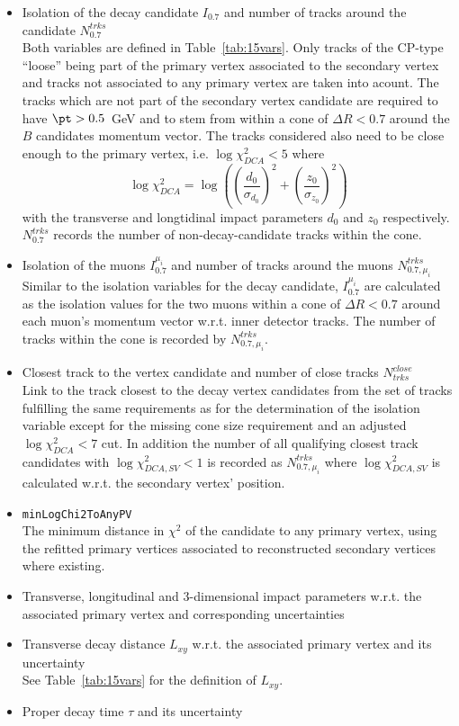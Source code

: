 \begin{itemize}
\item Isolation of the decay candidate $I_{0.7}$ and 
  number of tracks around the candidate $N^{trks}_{0.7}$\\
  Both variables are defined in Table~\ref{tab:15vars}.  Only 
  tracks of the CP-type ``loose'' being part of the primary vertex 
  associated to the secondary vertex and tracks not associated to any
  primary vertex are taken into acount.  The tracks which are not part
  of the secondary vertex candidate are required to
  have $\pt > 0.5$~GeV and to stem 
  from within a cone of $\Delta R < 0.7$ around the $B$ candidates
  momentum vector.  The tracks considered also need to be close enough
  to the primary vertex, i.e. $\log\chi^2_{DCA} < 5$ where
  \[ 
  \log\chi^2_{DCA} = \log\left(\left(\frac{d_0}{\sigma_{d_0}}\right)^2 
    + \left(\frac{z_0}{\sigma_{z_0}}\right)^2\right)
  \]
  with the transverse and longtidinal impact parameters $d_0$ and 
  $z_0$ respectively.
  $N^{trks}_{0.7}$ records the number of non-decay-candidate tracks
  within the cone.
\item Isolation of the muons $I_{0.7}^{\mu_i}$ and
  number of tracks around the muons $N_{0.7, \mu_i}^{trks}$\\
  Similar to the isolation variables for the decay candidate,
  $I_{0.7}^{\mu_i}$ are calculated as the isolation values for 
  the two muons within a cone of $\Delta R<0.7$ around each muon's
  momentum vector w.r.t. inner detector tracks.  The number of 
  tracks within the cone is recorded by $N_{0.7, \mu_i}^{trks}$.
\item Closest track to the vertex candidate and number of close
  tracks $N^{close}_{trks}$\\
  Link to the track closest to the decay vertex candidates from 
  the set of tracks fulfilling the same requirements as for the
  determination of the isolation variable except for the 
  missing cone size requirement and an adjusted  
  $\log\chi^2_{DCA} < 7$ cut.
  In addition the number of all qualifying closest track candidates
  with $\log\chi^2_{DCA,SV} < 1$ is recorded as  $N_{0.7,
    \mu_i}^{trks}$ where $\log\chi^2_{DCA,SV}$ is calculated w.r.t.
  the secondary vertex' position.
\item \texttt{minLogChi2ToAnyPV}\\
  The minimum distance in $\chi^2$ of the candidate to any primary
  vertex, using the refitted primary vertices associated to 
  reconstructed secondary vertices where existing.
\item Transverse, longitudinal and 3-dimensional impact parameters 
  w.r.t. the associated primary vertex and corresponding uncertainties
\item Transverse decay distance $L_{xy}$ w.r.t. the associated primary
  vertex and its uncertainty\\
  See Table~\ref{tab:15vars} for the definition of $L_{xy}$.
\item Proper decay time $\tau$ and its uncertainty
\end{itemize}

